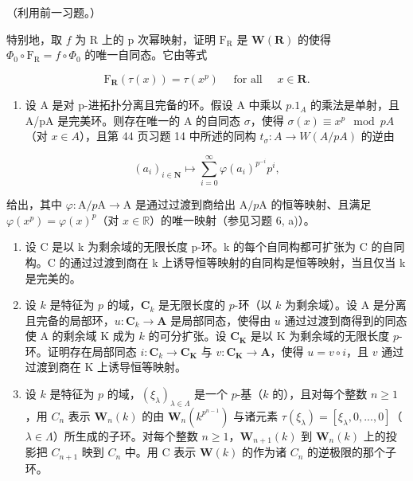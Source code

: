（利用前一习题。）

特别地，取 \(f\) 为 R 上的 p 次幂映射，证明 \(\mathrm{F}_{\mathrm{R}}\) 是 \(\mathbf{W}(\mathbf{R})\) 的使得 \(\Phi_{0} \circ \mathrm{F}_{\mathrm{R}} = f \circ \Phi_{0}\) 的唯一自同态。它由等式

\[
\mathrm{F} _ {\mathbf {R}} (\tau (x)) = \tau (x ^ {p}) \quad \text { for all } \quad x \in \mathbf {R}  .
\]

\begin{enumerate}
\def\labelenumi{\alph{enumi})}
\setcounter{enumi}{1}
\tightlist
\item
  设 A 是对 p-进拓扑分离且完备的环。假设 A 中乘以 \(p.1_{A}\) 的乘法是单射，且 A/pA 是完美环。则存在唯一的 A 的自同态 \(\sigma\)，使得 \(\sigma(x) \equiv x^{p} \mod pA\)（对 \(x \in A\)），且第 44 页习题 14 中所述的同构 \(t_{\sigma}: A \to W(A/pA)\) 的逆由
\end{enumerate}

\[
(a _ {i}) _ {i \in \mathbf {N}} \mapsto \sum_ {i = 0} ^ {\infty} \varphi (a _ {i}) ^ {p ^ {- i}} p ^ {i},
\]

给出，其中 \(\varphi : \mathrm{A} / p\mathrm{A} \to \mathrm{A}\) 是通过过渡到商给出 \(\mathrm{A} / p\mathrm{A}\) 的恒等映射、且满足 \(\varphi(x^p) = \varphi(x)^p\)（对 \(x \in \mathbb{R}\)）的唯一映射（参见习题 6, a)）。

\begin{enumerate}
\def\labelenumi{\arabic{enumi})}
\setcounter{enumi}{7}
\item
  设 C 是以 k 为剩余域的无限长度 p-环。k 的每个自同构都可扩张为 C 的自同构。C 的通过过渡到商在 k 上诱导恒等映射的自同构是恒等映射，当且仅当 k 是完美的。
\item
  设 \(k\) 是特征为 \(p\) 的域，\(\mathbf{C}_k\) 是无限长度的 \(p\)-环（以 \(k\) 为剩余域）。设 A 是分离且完备的局部环，\(u: \mathbf{C}_k \to \mathbf{A}\) 是局部同态，使得由 \(u\) 通过过渡到商得到的同态使 A 的剩余域 K 成为 \(k\) 的可分扩张。设 \(\mathbf{C}_{\mathbf{K}}\) 是以 K 为剩余域的无限长度 \(p\)-环。证明存在局部同态 \(i: \mathbf{C}_k \to \mathbf{C}_{\mathbf{K}}\) 与 \(v: \mathbf{C}_{\mathbf{K}} \to \mathbf{A}\)，使得 \(u = v \circ i\)，且 \(v\) 通过过渡到商在 K 上诱导恒等映射。
\item
  设 \(k\) 是特征为 \(p\) 的域，\((\xi_{\lambda})_{\lambda \in \Lambda}\) 是一个 \(p\)-基（\(k\) 的），且对每个整数 \(n \geqslant 1\)，用 \(C_n\) 表示 \(\mathbf{W}_n(k)\) 的由 \(\mathbf{W}_n(k^{p^{n-1}})\) 与诸元素 \(\tau(\xi_{\lambda}) = [\xi_{\lambda}, 0, ..., 0]\)（\(\lambda \in \Lambda\)）所生成的子环。对每个整数 \(n \geqslant 1\)，\(\mathbf{W}_{n+1}(k)\) 到 \(\mathbf{W}_n(k)\) 上的投影把 \(C_{n+1}\) 映到 \(C_n\) 中。用 C 表示 \(\mathbf{W}(k)\) 的作为诸 \(C_n\) 的逆极限的那个子环。
\end{enumerate}

